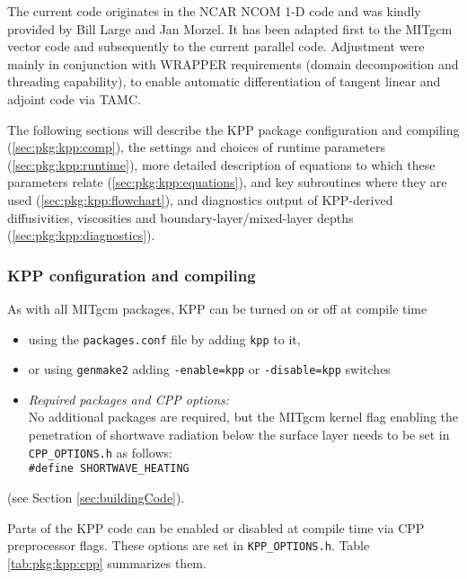 The current code originates in the NCAR NCOM 1-D code
and was kindly provided by Bill Large and Jan Morzel.
It has been adapted first to the MITgcm vector code and
subsequently to the current parallel code.
Adjustment were mainly in conjunction with WRAPPER requirements
(domain decomposition and threading capability), to enable
automatic differentiation of tangent linear and adjoint code
via TAMC.

The following sections will describe the KPP package
configuration and compiling (\ref{sec:pkg:kpp:comp}),
the settings and choices of runtime parameters
(\ref{sec:pkg:kpp:runtime}),
more detailed description of equations to which these
parameters relate (\ref{sec:pkg:kpp:equations}),
and key subroutines where they are used %
(\ref{sec:pkg:kpp:flowchart}),
and diagnostics output of KPP-derived diffusivities, viscosities
and boundary-layer/mixed-layer depths 
(\ref{sec:pkg:kpp:diagnostics}).


\subsubsection{KPP configuration and compiling
\label{sec:pkg:kpp:comp}}

As with all MITgcm packages, KPP can be turned on or off at compile time
%
\begin{itemize}
%
\item
using the \texttt{packages.conf} file by adding \texttt{kpp} to it,
%
\item
or using \texttt{genmake2} adding
\texttt{-enable=kpp} or \texttt{-disable=kpp} switches
%
\item
\textit{Required packages and CPP options:} \\
No additional packages are required, but the MITgcm kernel flag
enabling the penetration of shortwave radiation below
the surface layer needs to be set in \texttt{CPP\_OPTIONS.h} 
as follows: \\
\texttt{\#define SHORTWAVE\_HEATING}
%
\end{itemize}
(see Section \ref{sec:buildingCode}).

Parts of the KPP code can be enabled or disabled at compile time
via CPP preprocessor flags. These options are set in
\texttt{KPP\_OPTIONS.h}. Table \ref{tab:pkg:kpp:cpp} summarizes them.

